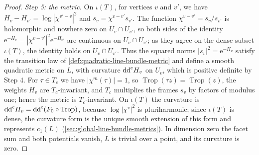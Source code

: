 \begin{proof}
\emph{Step 5: the metric.} On $\iota(T)$, for vertices $v$ and $v'$, we have $H_v-H_{v'}=\log|\chi^{v'-v}|^2$ and $s_v=\chi^{v-v'}s_{v'}$. The function $\chi^{v-v'}=s_v/s_{v'}$ is holomorphic and nowhere zero on $U_v\cap U_{v'}$, so both sides of the identity $\mathrm e^{-H_v}=|\chi^{v-v'}|^2\mathrm e^{-H_{v'}}$ are continuous on $U_v\cap U_{v'}$; as they agree on the dense subset $\iota(T)$, the identity holds on $U_v\cap U_{v'}$. Thus the squared norms $|s_v|^2=\mathrm e^{-H_v}$ satisfy the transition law of \cref{def:quadratic-line-bundle-metric} and define a smooth quadratic metric on $L$, with curvature $\mathrm{dd}^{\mathrm{c}} H_v$ on $U_v$, which is positive definite by Step 4. For $\tau\in T_c$ we have $|\chi^m(\tau)|=1$, so $\operatorname{Trop}(\tau z)=\operatorname{Trop}(z)$, the weights $H_v$ are $T_c$-invariant, and $T_c$ multiplies the frames $s_v$ by factors of modulus one; hence the metric is $T_c$-invariant. On $\iota(T)$ the curvature is $\mathrm{dd}^{\mathrm{c}} H_v=\mathrm{dd}^{\mathrm{c}}(F_0\circ\operatorname{Trop})$, because $\log|\chi^v|^2$ is pluriharmonic; since $\iota(T)$ is dense, the curvature form is the unique smooth extension of this form and represents $c_1(L)$ (\cref{sec:global-line-bundle-metrics}). In dimension zero the facet sum and both potentials vanish, $L$ is trivial over a point, and its curvature is zero.
\end{proof}
